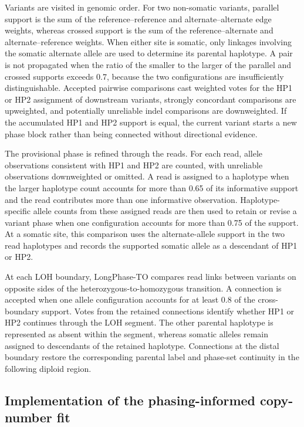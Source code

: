 \documentclass[pdflatex,sn-nature]{sn-jnl}
\begin{document}
Variants are visited in genomic order. For two non-somatic variants, parallel support is the sum of the reference--reference and alternate--alternate edge weights, whereas crossed support is the sum of the reference--alternate and alternate--reference weights. When either site is somatic, only linkages involving the somatic alternate allele are used to determine its parental haplotype. A pair is not propagated when the ratio of the smaller to the larger of the parallel and crossed supports exceeds 0.7, because the two configurations are insufficiently distinguishable. Accepted pairwise comparisons cast weighted votes for the HP1 or HP2 assignment of downstream variants, strongly concordant comparisons are upweighted, and potentially unreliable indel comparisons are downweighted. If the accumulated HP1 and HP2 support is equal, the current variant starts a new phase block rather than being connected without directional evidence.

The provisional phase is refined through the reads. For each read, allele observations consistent with HP1 and HP2 are counted, with unreliable observations downweighted or omitted. A read is assigned to a haplotype when the larger haplotype count accounts for more than 0.65 of its informative support and the read contributes more than one informative observation. Haplotype-specific allele counts from these assigned reads are then used to retain or revise a variant phase when one configuration accounts for more than 0.75 of the support. At a somatic site, this comparison uses the alternate-allele support in the two read haplotypes and records the supported somatic allele as a descendant of HP1 or HP2.

At each LOH boundary, LongPhase-TO compares read links between variants on opposite sides of the heterozygous-to-homozygous transition. A connection is accepted when one allele configuration accounts for at least 0.8 of the cross-boundary support. Votes from the retained connections identify whether HP1 or HP2 continues through the LOH segment. The other parental haplotype is represented as absent within the segment, whereas somatic alleles remain assigned to descendants of the retained haplotype. Connections at the distal boundary restore the corresponding parental label and phase-set continuity in the following diploid region.

\subsection{Implementation of the phasing-informed copy-number fit}
\label{app:tdf-implementation}
\end{document}
